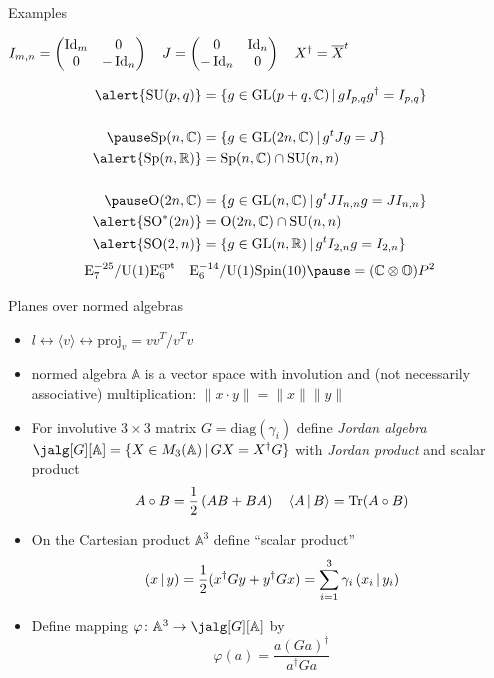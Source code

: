 \documentclass[10pt]{beamer}
\begin{document}
\begin{frame}{Examples}

$
 I_{m,n} = \begin{pmatrix} \operatorname{\mathrm{Id}}_m & 0 \\ 0 & -\operatorname{\mathrm{Id}}_n \end{pmatrix} \quad J = \begin{pmatrix} 0 & \operatorname{\mathrm{Id}}_n \\ -\operatorname{\mathrm{Id}}_n & 0 \end{pmatrix} \quad X^\dag = \overline{X}^t
$
\pause

\begin{equation*}
\begin{aligned}
\alert{\mathrm{SU}(p,q)} &= \{ g \in \mathrm{GL}(p +q, \mathbb{C}) \,|\, g I_{p,q}g^\dag = I_{p,q} \}\\[0.5cm]
\pause
\mathrm{Sp}(n, \mathbb{C}) &= \{ g \in \mathrm{GL}(2n, \mathbb{C}) \,|\, g^t J g  = J \}\\
\alert{\mathrm{Sp}(n, \mathbb{R})} &= \mathrm{Sp}(n, \mathbb{C}) \cap \mathrm{SU}(n,n) \\[0.5cm]
\pause
\mathrm{O}(2n, \mathbb{C}) &= \{ g \in \mathrm{GL}(n, \mathbb{C}) \,|\, g^t JI_{n,n} g  = JI_{n,n} \}\\
\alert{\mathrm{SO}^*(2n)} &=  \mathrm{O}(2n, \mathbb{C}) \cap \mathrm{SU}(n,n) \\
\alert{\mathrm{SO}(2, n)} &= \{ g \in \mathrm{GL}(n, \mathbb{R})\,|\, g^t I_{2,n} g  = I_{2,n} \}
\end{aligned}
\end{equation*}
\pause
\alert{
\[
	\mathrm{E^{-25}_7 / U(1)E_6^\text{cpt} \quad E^{-14}_6 / U(1)Spin(10)} \pause = (\mathbb{C}\otimes\mathbb{O})P^2
\]
}
\end{frame}



\begin{frame}{Planes over normed algebras}
\begin{itemize}[<+- | alert@+>]
	\item $l \leftrightarrow \langle v \rangle \leftrightarrow \mathrm{proj}_v = vv^T / v^Tv$
	\item normed algebra $\mathbb{A}$ is a vector space with involution and (not
necessarily associative) multiplication: $\| x \cdot y \| = \|x\| \|y\|$
	\item For involutive $3\times 3$ matrix $G = \mathrm{diag}(\gamma_i)$ define \emph{Jordan algebra} $\jalg[G][\mathbb{A}] =\{ X \in M_3(\mathbb{A}) \,|\, GX = X^\dag G \} $ with \emph{Jordan product} and scalar product
	\[
 A \circ B = \frac{1}{2} \left( AB + BA \right) \quad \langle A\,|\, B \rangle = \mathrm{Tr}(A \circ B)
\]
\item On the Cartesian product $\mathbb{A}^3$ define ``scalar product''  
\[\left( x \,|\, y \right) = \frac{1}{2}(x^\dagger G y + y^\dagger G x) = \sum_{i=1}^3 \gamma_i\left( x_i \,|\, y_i \right)\]
\item Define mapping $\varphi\colon \mathbb{A}^3 \to \jalg[G][\mathbb{A}]$ by
\[
	\varphi(a) = \frac{a(Ga)^\dagger}{a^\dagger Ga}
\]
\end{itemize}
\end{frame}
\end{document}
